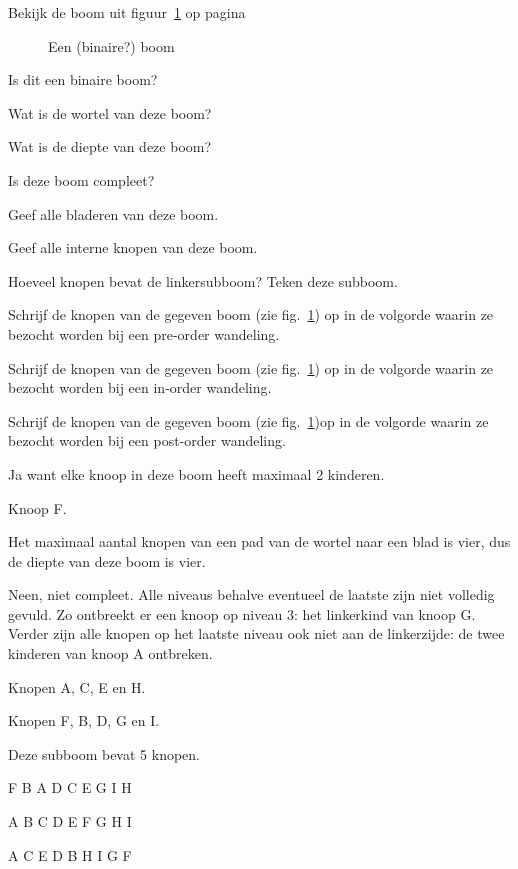 \begin{oef}
\papier Bekijk de boom uit figuur~\ref{fig:binboom} op pagina~\pageref{fig:binboom}
\begin{figure}[htbp]
    \centering
{}
\caption{Een (binaire?) boom}
    \label{fig:binboom}
\end{figure}

\begin{oefenumerate}[label=\alph*)]
	\item Is dit een binaire boom?
	\item Wat is de wortel van deze boom?
	\item Wat is de diepte van deze boom?
	\item Is deze boom compleet?
	\item Geef alle bladeren van deze boom.
	\item Geef alle interne knopen van deze boom.
	\item Hoeveel knopen bevat de linkersubboom? Teken deze subboom.
	\item Schrijf de knopen van de gegeven boom (zie fig.~\ref{fig:binboom}) op in de volgorde waarin ze bezocht worden bij een pre-order wandeling.
	\item Schrijf de knopen van de gegeven boom (zie fig.~\ref{fig:binboom}) op in de volgorde waarin ze bezocht worden bij een in-order wandeling.
	\item Schrijf de knopen van de gegeven boom (zie fig.~\ref{fig:binboom})op in de volgorde waarin ze bezocht worden bij een post-order wandeling.
\end{oefenumerate}
\begin{opl}

\begin{oefenumerate}
	\item Ja want elke knoop in deze boom heeft maximaal 2 kinderen.
	\item Knoop F.
	\item Het maximaal aantal knopen van een pad van de wortel naar 
een blad is vier, dus de diepte van deze boom is vier.
	\item Neen, niet compleet.
Alle niveaus behalve eventueel de laatste zijn niet 
volledig gevuld. Zo ontbreekt er een knoop op niveau 3: 
het linkerkind van knoop G. 
Verder zijn alle knopen op het laatste niveau ook niet 
aan de linkerzijde: de twee kinderen van knoop A ontbreken.
	\item Knopen A, C, E en H.
	\item Knopen F, B, D, G en I.
	\item Deze subboom bevat 5 knopen.
	\item F B A D C E G I H
	\item A B C D E F G H I
	\item A C E D B H I G F


\end{oefenumerate}
\end{opl}
\end{oef}
